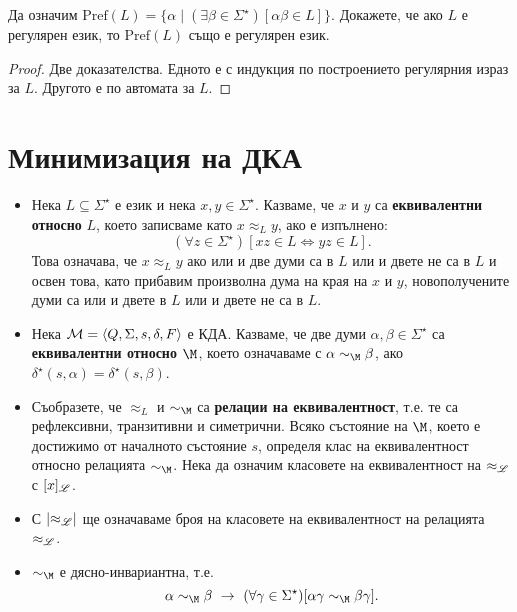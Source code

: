 \begin{problem}
  Да означим $\mbox{Pref}(L) = \{\alpha \mid (\exists \beta \in \Sigma^\star)[\alpha\beta \in L]\}$.
  Докажете, че ако $L$ е регулярен език, то $\mbox{Pref}(L)$ също е регулярен език.
\end{problem}
\begin{proof}
  Две доказателства. Едното е с индукция по построението регулярния израз за $L$.
  Другото е по автомата за $L$.
\end{proof}

\section{Минимизация на ДКА}

\begin{itemize}
\item
  Нека $L \subseteq \Sigma^\star$ е език и нека $x,y \in \Sigma^\star$.
  Казваме, че $x$ и $y$ са {\bf еквивалентни относно} $L$, което записваме 
  като $x \approx_L y$, ако е изпълнено:
  \[(\forall z \in \Sigma^\star)[xz \in L \iff yz \in L].\]
  Това означава, че $x\approx_L y$ ако или и две думи са в $L$ или и двете не са в $L$
  и освен това, като прибавим произволна дума на края на $x$ и $y$, новополучените
  думи са или и двете в $L$ или и двете не са в $L$.  
\item
  Нека $\mathcal{M} = \langle{Q,\Sigma,s,\delta,F}\rangle$ е КДА.
  Казваме, че две думи $\alpha,\beta \in \Sigma^\star$ са {\bf еквивалентни относно $\M$},
  което означаваме с $\alpha \sim_\M \beta$, ако $\delta^\star(s,\alpha) = \delta^\star(s,\beta)$.
\item
  Съобразете, че $\approx_L$ и $\sim_\M$ са {\bf релации на еквивалентност}, т.е.
  те са рефлексивни, транзитивни и симетрични.
  Всяко състояние на $\M$, което е достижимо от началното състояние $s$, определя клас на еквивалентност относно 
  релацията $\sim_\M$.  
  Нека да означим класовете на еквивалентност на $\approx_{\mathscr{L}}$ с $[x]_{\mathscr{L}}$. 
\item
  С $\vert{\approx_{\mathscr{L}}}\vert$ ще означаваме броя на класовете на еквивалентност на релацията $\approx_{\mathscr{L}}$.
\item
  $\sim_\M$ е дясно-инвариантна, т.е.
  \[\alpha \sim_\M \beta\ \rightarrow\ (\forall \gamma\in\Sigma^\star)[\alpha\gamma \sim_\M \beta\gamma].\]
\end{itemize}


